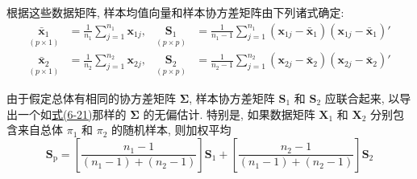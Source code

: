 根据这些数据矩阵, 样本均值向量和样本协方差矩阵由下列诸式确定:
\label{eq:11-16}
\begin{equation}
\begin{aligned}
\underset{(p\times1)}{\bar{\mathbf{x}}_1}&=\frac{1}{n_1}\sum_{j=1}^{n_1}\mathbf{x}_{1j}, & \underset{(p\times p)}{\mathbf{S}_1}&=\frac{1}{n_1-1}\sum_{j=1}^{n_1}(\mathbf{x}_{1j}-\bar{\mathbf{x}}_1)(\mathbf{x}_{1j}-\bar{\mathbf{x}}_1)'\\
\underset{(p\times1)}{\bar{\mathbf{x}}_2}&=\frac{1}{n_2}\sum_{j=1}^{n_2}\mathbf{x}_{2j}, & \underset{(p\times p)}{\mathbf{S}_2}&=\frac{1}{n_2-1}\sum_{j=1}^{n_2}(\mathbf{x}_{2j}-\bar{\mathbf{x}}_2)(\mathbf{x}_{2j}-\bar{\mathbf{x}}_2)'
\end{aligned}
\tag{11-16}
\end{equation}

由于假定总体有相同的协方差矩阵 $\boldsymbol{\Sigma}$, 样本协方差矩阵 $\mathbf{S}_1$ 和 $\mathbf{S}_2$ 应联合起来, 以导出一个如\hyperref[eq:6-21]{式(6-21)}那样的 $\boldsymbol{\Sigma}$ 的无偏估计. 特别是, 如果数据矩阵 $\mathbf{X}_1$ 和 $\mathbf{X}_2$ 分别包含来自总体 $\pi_1$ 和 $\pi_2$ 的随机样本, 则加权平均
\label{eq:11-17}
\begin{equation}
\mathbf{S}_{\mathrm{p}}=\left[\frac{n_1-1}{(n_1-1)+(n_2-1)}\right]\mathbf{S}_1+\left[\frac{n_2-1}{(n_1-1)+(n_2-1)}\right]\mathbf{S}_2
\tag{11-17}
\end{equation}
